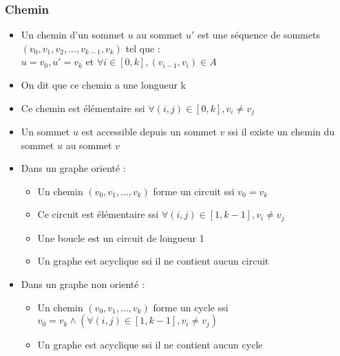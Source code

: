 \documentclass{beamer}
\let\oldsubsubsection\subsubsection
\renewcommand{\subsubsection}[2][]{\def\currentsubsubsection{#2}\oldsubsubsection[#1]{#2}}
\begin{document}
\subsubsection{Chemin}
\begin{frame}
\begin{itemize}
        \item Un chemin d'un sommet $u$ au sommet $u'$ est une séquence de sommets $(v_{0},v_{1},v_{2}, ..., v_{k-1},v_{k})$ tel que :\\[0.2cm]

\centering$u = v_{0}, u' = v_{k}$ et $\forall i \in \left[ 0,k \right], \left(v_{i-1},v_{i}\right) \in A$
\\[0.2cm]

\item\justifying On dit que ce chemin a une longueur k

\item Ce chemin est élémentaire ssi $\forall \left(i,j\right) \in \left[ 0,k \right], v_{i} \neq v_{j}$

\item Un sommet $u$ est accessible depuis un sommet $v$ ssi il existe un chemin du sommet $u$ au sommet $v$
\end{itemize}
\end{frame}
\begin{frame}
    \begin{itemize}
    \item Dans un graphe orienté :
    \begin{itemize}
    \item Un chemin $(v_{0},v_{1},...,v_{k})$ forme un circuit ssi $v_{0}= v_{k}$

    \item Ce circuit est élémentaire ssi $\forall \left(i,j\right) \in \left[1,k-1\right], v_{i} \neq v_{j}$

    \item Une boucle est un circuit de longueur 1

    \item Un graphe est acyclique ssi il ne contient aucun circuit
    \end{itemize}
    \item Dans un graphe non orienté :
    \begin{itemize}
    \item Un chemin $(v_{0},v_{1},...,v_{k})$ forme un cycle ssi
    \\[0.2cm]\centering$v_{0}= v_{k} \wedge \left(\forall \left(i,j\right) \in \left[1,k-1\right], v_{i} \neq v_{j}\right)$\\[0.2cm]

    \item \justifying Un graphe est acyclique ssi il ne contient aucun cycle
    \end{itemize}
    \end{itemize}
\end{frame}
\end{document}
